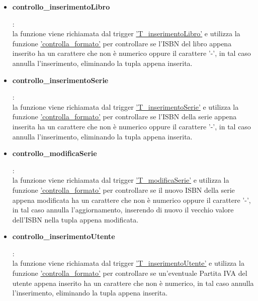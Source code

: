 \documentclass{article}
\begin{document}
\begin{itemize}
    \item \hypertarget{f28}{\textbf{controllo\_inserimentoLibro}}:\\
    la funzione viene richiamata dal trigger \hyperlink{t29}{'T\_inserimentoLibro'} e utilizza la funzione \hyperlink{f24}{'controlla\_formato'} per controllare se l'ISBN del libro appena inserito ha un carattere che non è numerico oppure il carattere '-', in tal caso annulla l'inserimento, eliminando la tupla appena inserita.

    \item \hypertarget{f29}{\textbf{controllo\_inserimentoSerie}}:\\
    la funzione viene richiamata dal trigger \hyperlink{t30}{'T\_inserimentoSerie'} e utilizza la funzione \hyperlink{f24}{'controlla\_formato'} per controllare se l'ISBN della serie appena inserita ha un carattere che non è numerico oppure il carattere '-', in tal caso annulla l'inserimento, eliminando la tupla appena inserita.

    \item \hypertarget{f30}{\textbf{controllo\_modificaSerie}}:\\
    la funzione viene richiamata dal trigger \hyperlink{t31}{'T\_modificaSerie'} e utilizza la funzione \hyperlink{f24}{'controlla\_formato'} per controllare se il nuovo ISBN della serie appena modificata ha un carattere che non è numerico oppure il carattere '-', in tal caso annulla l'aggiornamento, inserendo di nuovo il vecchio valore dell'ISBN nella tupla appena modificata.

    \item \hypertarget{f31}{\textbf{controllo\_inserimentoUtente}}:\\
    la funzione viene richiamata dal trigger \hyperlink{t32}{'T\_inserimentoUtente'} e utilizza la funzione \hyperlink{f24}{'controlla\_formato'} per controllare se un'eventuale Partita IVA del utente appena inserito ha un carattere che non è numerico, in tal caso annulla l'inserimento, eliminando la tupla appena inserita.
\end{itemize}
\end{document}
